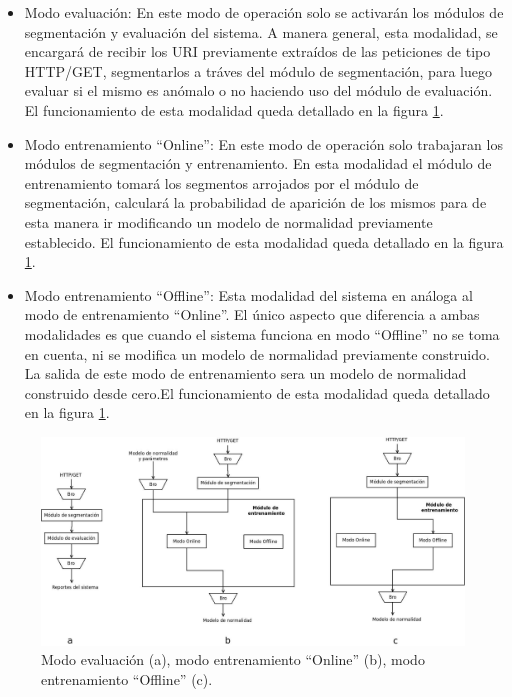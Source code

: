 \begin{itemize}
\item Modo evaluación: En este modo de operación solo se activarán los módulos de segmentación y evaluación del sistema. A manera general, esta modalidad, se encargará de recibir los URI previamente extraídos de las peticiones de tipo HTTP/GET, segmentarlos a tráves del módulo de segmentación, para luego evaluar si el mismo es anómalo o no
haciendo uso del módulo de evaluación. El funcionamiento de esta modalidad queda detallado en la figura \ref{fig:modoSistema}.
\item Modo entrenamiento ``Online'': En este modo de operación solo trabajaran los módulos de segmentación y entrenamiento. En esta modalidad el módulo de entrenamiento tomará los segmentos arrojados por el módulo de segmentación, calculará la probabilidad de aparición de los mismos para de esta manera ir modificando un modelo de normalidad previamente establecido. El funcionamiento de esta modalidad queda
detallado en la figura \ref{fig:modoSistema}.
\item Modo entrenamiento ``Offline'': Esta modalidad del sistema en análoga al modo de entrenamiento ``Online''. El único aspecto que diferencia a ambas modalidades es que cuando el sistema funciona en modo ``Offline'' no se toma en cuenta, ni se modifica un modelo de normalidad previamente construido. La salida de este modo de entrenamiento sera un modelo de normalidad construido desde cero.El funcionamiento de esta modalidad queda detallado en la figura \ref{fig:modoSistema}.
\end{itemize}

\begin{figure}[!htb]
\begin{center}
\includegraphics[width=\linewidth]{./img/modoOperacion.jpeg}
\caption{Modo evaluación (a), modo entrenamiento ``Online'' (b), modo entrenamiento ``Offline'' (c).}
\label{fig:modoSistema}
\end{center}
\end{figure}


